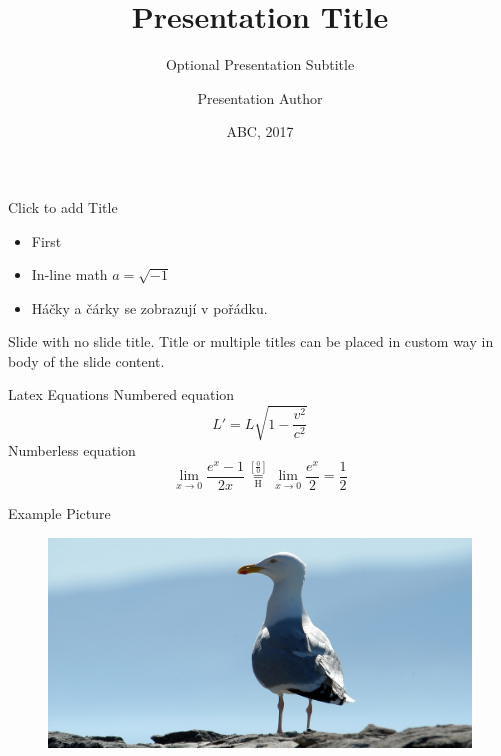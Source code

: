 \documentclass{beamer}
\title{Presentation Title}
\subtitle{Optional Presentation Subtitle}
\author{Presentation Author}
\institute{Department, Faculty, CTU in Prague}
\date{ABC, 2017}
\begin{document}
\begin{frame}
  \clearpage\thispagestyle{empty}\titlepage
\end{frame}

\begin{frame}{Click to add Title}
\begin{itemize}
    \item First
    \item In-line math $a = \sqrt{-1}$
    \item Háčky a čárky se zobrazují v pořádku.
\end{itemize}
\end{frame}

\begin{frame}
    Slide with no slide title. Title or multiple titles can be placed in custom way in body of the slide content.
\end{frame}


\begin{frame}{Latex Equations}
Numbered equation
 \begin{equation}
  L' = {L}{\sqrt{1-\frac{v^2}{c^2}}}
 \end{equation}
Numberless equation
\begin{equation*}
 \lim_{x\to 0}{\frac{e^x-1}{2x}}
 \overset{\left[\frac{0}{0}\right]}{\underset{\mathrm{H}}{=}}
 \lim_{x\to 0}{\frac{e^x}{2}}={\frac{1}{2}}    
\end{equation*}

\end{frame}


\begin{frame}{Example Picture}
    \begin{figure}[]
    \includegraphics[width=1.\textwidth]{gull.jpg}
    \end{figure}
\end{frame}
\end{document}
